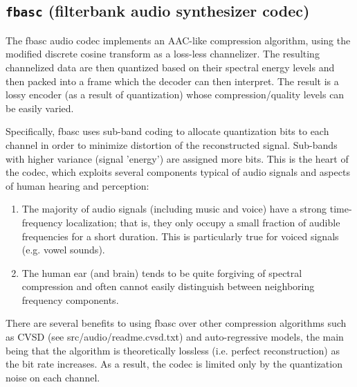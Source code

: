 \subsection{{\tt fbasc} (filterbank audio synthesizer codec)}
\label{module:audio:fbasc}

The fbasc audio codec implements an AAC-like compression algorithm, using the
modified discrete cosine transform as a loss-less channelizer.  The resulting
channelized data are then quantized based on their spectral energy levels and
then packed into a frame which the decoder can then interpret. The result is a
lossy encoder (as a result of quantization) whose compression/quality levels
can be easily varied.


Specifically, fbasc uses sub-band coding to allocate quantization bits to each
channel in order to minimize distortion of the reconstructed signal. Sub-bands
with higher variance (signal 'energy') are assigned more bits.  This is the
heart of the codec, which exploits several components typical of audio signals
and aspects of human hearing and perception:
\begin{enumerate}
\item The majority of audio signals (including music and voice) have a
      strong time-frequency localization; that is, they only occupy a small
      fraction of audible frequencies for a short duration.  This is
      particularly true for voiced signals (e.g. vowel sounds).
\item The human ear (and brain) tends to be quite forgiving of spectral
      compression and often cannot easily distinguish between neighboring
      frequency components.
\end{enumerate}

There are several benefits to using fbasc over other compression algorithms
such as CVSD (see src/audio/readme.cvsd.txt) and auto-regressive models, the
main being that the algorithm is theoretically lossless (i.e. perfect
reconstruction) as the bit rate increases.  As a result, the codec is limited
only by the quantization noise on each channel.


